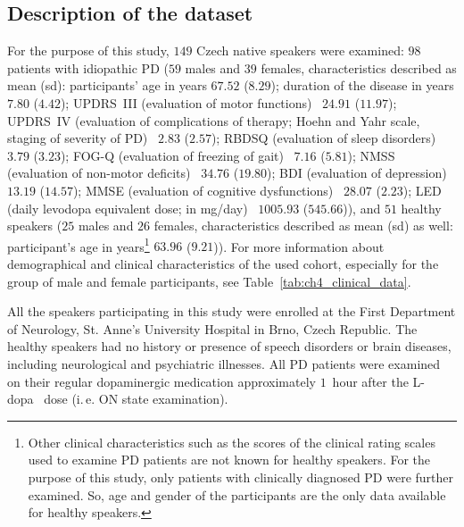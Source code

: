 \subsection{Description of the dataset}
\label{ch4_3_1}

For the purpose of this study, $149$ Czech native speakers were examined: $98$ patients with idiopathic PD ($59$ males and $39$ females, characteristics described as mean (sd): participants' age in years $67.52$ ($8.29$); duration of the disease in years $7.80$ ($4.42$); UPDRS~III (evaluation of motor functions)~\cite{Fahn1987} $24.91$ ($11.97$); UPDRS~IV (evaluation of complications of therapy; Hoehn and Yahr scale, staging of severity of PD)~\cite{Fahn1987} $2.83$ ($2.57$); RBDSQ (evaluation of sleep disorders)~\cite{Stiasny2007} $3.79$ ($3.23$); FOG-Q (evaluation of freezing of gait)~\cite{Giladi2000} $7.16$ ($5.81$); NMSS (evaluation of non-motor deficits)~\cite{Chaudhuri2007} $34.76$ ($19.80$); BDI (evaluation of depression) \cite{Beck2000, Beck1961} $13.19$ ($14.57$); MMSE (evaluation of cognitive dysfunctions)~\cite{Folstein1975} $28.07$ ($2.23$); LED (daily levodopa equivalent dose; in mg/day)~\cite{Lee2010} $1005.93$ ($545.66$)), and $51$ healthy speakers ($25$ males and $26$ females, characteristics described as mean (sd) as well: participant's age in years\footnote{Other clinical characteristics such as the scores of the clinical rating scales used to examine PD patients are not known for healthy speakers. For the purpose of this study, only patients with clinically diagnosed PD were further examined. So, age and gender of the participants are the only data available for healthy speakers.} $63.96$ ($9.21$)). For more information about demographical and clinical characteristics of the used cohort, especially for the group of male and female participants, see Table~\ref{tab:ch4_clinical_data}. 

All the speakers participating in this study were enrolled at the First Department of Neurology, St. Anne's University Hospital in Brno, Czech Republic. The healthy speakers had no history or presence of speech disorders or brain diseases, including neurological and psychiatric illnesses. All PD patients were examined on their regular dopaminergic medication approximately $1$~hour after the L-dopa~\cite{Lee2010} dose (i.\,e. ON state examination).

